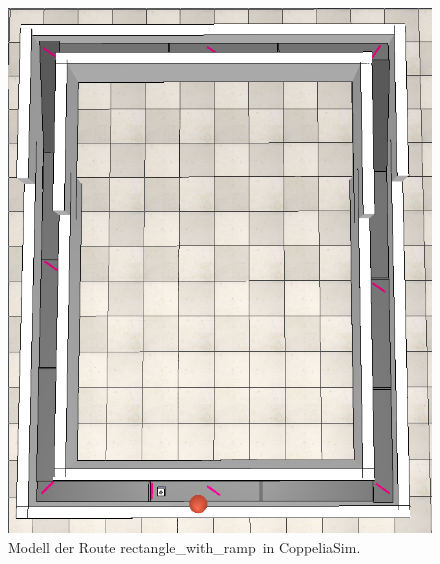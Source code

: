\begin{figure}[h!]
    \centering
    \includegraphics[angle=90, width=\linewidth]{images/rectangle_with_ramp.png}
    \caption{Modell der Route \glqq rectangle\_with\_ramp\grqq\ in CoppeliaSim.}
    \label{fig:rectangle_with_ramp}
\end{figure}

